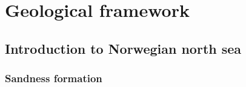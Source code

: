 \chapter{Geological framework}

\section{Introduction to Norwegian north sea}

\subsection{Sandness formation}
